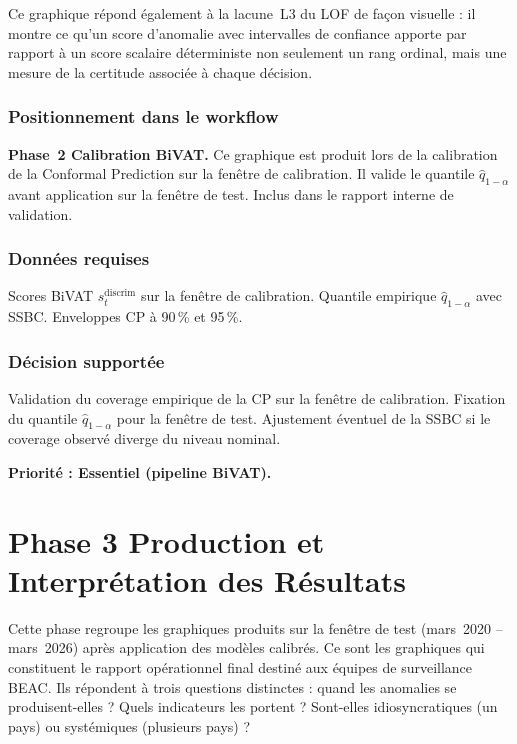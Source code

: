 \documentclass[12pt,a4paper]{article}
\begin{document}
Ce graphique répond également à la lacune~L3 du LOF de façon visuelle :
il montre ce qu'un score d'anomalie avec intervalles de confiance apporte
par rapport à un score scalaire déterministe  non seulement un rang
ordinal, mais une mesure de la certitude associée à chaque décision.

\subsubsection{Positionnement dans le workflow}

\textbf{Phase~2  Calibration BiVAT.} Ce graphique est produit lors de
la calibration de la Conformal Prediction sur la fenêtre de calibration.
Il valide le quantile $\hat{q}_{1-\alpha}$ avant application sur la fenêtre
de test. Inclus dans le rapport interne de validation.

\subsubsection{Données requises}

Scores BiVAT $s^{\mathrm{discrim}}_t$ sur la fenêtre de calibration.
Quantile empirique $\hat{q}_{1-\alpha}$ avec SSBC. Enveloppes CP à 90\,\%
et 95\,\%.

\subsubsection{Décision supportée}

Validation du coverage empirique de la CP sur la fenêtre de calibration.
Fixation du quantile $\hat{q}_{1-\alpha}$ pour la fenêtre de test.
Ajustement éventuel de la SSBC si le coverage observé diverge du niveau
nominal.

\textbf{Priorité : Essentiel (pipeline BiVAT).}

\section{Phase 3  Production et Interprétation des Résultats}

Cette phase regroupe les graphiques produits sur la fenêtre de test
(mars~2020 -- mars~2026) après application des modèles calibrés. Ce sont
les graphiques qui constituent le rapport opérationnel final destiné aux
équipes de surveillance BEAC. Ils répondent à trois questions distinctes :
quand les anomalies se produisent-elles ? Quels indicateurs les portent ?
Sont-elles idiosyncratiques (un pays) ou systémiques (plusieurs pays) ?
\end{document}

